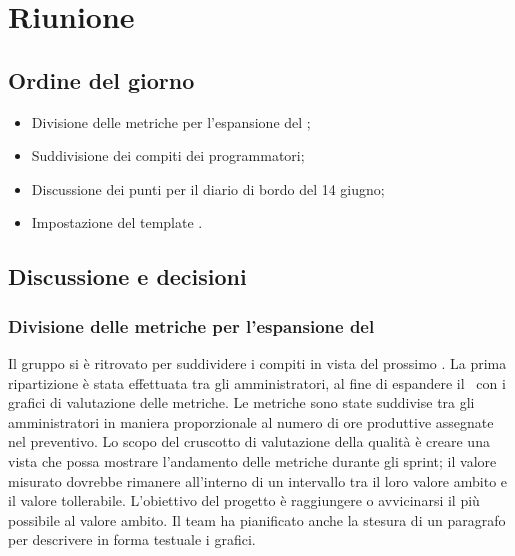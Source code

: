 \section{Riunione}
\subsection{Ordine del giorno}
\begin{itemize}
	\item Divisione delle metriche per l'espansione del \PdQ;
	\item Suddivisione dei compiti dei programmatori;
	\item Discussione dei punti per il diario di bordo del 14 giugno;
	\item Impostazione del template .
\end{itemize}

\subsection{Discussione e decisioni}
\subsubsection{Divisione delle metriche per l'espansione del \PdQ}
\par Il gruppo si è ritrovato per suddividere i compiti in vista del prossimo . 
La prima ripartizione è stata effettuata tra gli amministratori, al fine di espandere il \PdQ\ con i grafici di valutazione delle metriche. 
Le metriche sono state suddivise tra gli amministratori in maniera proporzionale al numero di ore produttive assegnate nel preventivo. Lo scopo del cruscotto di valutazione della qualità è creare una vista che possa mostrare l'andamento delle metriche durante gli sprint; il valore misurato dovrebbe rimanere all'interno di un intervallo tra il loro valore ambito e il valore tollerabile. 
L'obiettivo del progetto è raggiungere o avvicinarsi il più possibile al valore ambito.
Il team ha pianificato anche la stesura di un paragrafo per descrivere in forma testuale i grafici.

